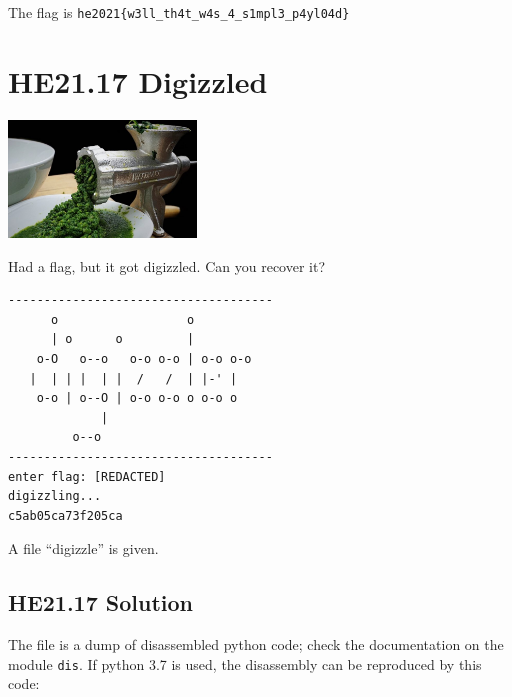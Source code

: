 \documentclass[english,a4paper,nols,noindent]{tufte-handout}
\begin{document}
The flag is \verb+he2021{w3ll_th4t_w4s_4_s1mpl3_p4yl04d}+


\hypertarget{he21.17}{%
  \section{HE21.17 Digizzled}
  \label{he21.17}}
\begin{marginfigure}
    \includegraphics[width=50mm]{images/challenge17.jpg}
\end{marginfigure}

\noindent Had a flag, but it got digizzled. Can you recover it?

\begin{verbatim}
-------------------------------------  
      o                  o             
      | o      o         |             
    o-O   o--o   o-o o-o | o-o o-o     
   |  | | |  | |  /   /  | |-' |       
    o-o | o--O | o-o o-o o o-o o       
             |                         
         o--o                          
-------------------------------------
enter flag: [REDACTED]    
digizzling...  
c5ab05ca73f205ca  
\end{verbatim}

A file ``digizzle'' is given.

\hypertarget{he21.17-solution}{%
\subsection{HE21.17 Solution}\label{he21.17-solution}}

\noindent The file is a dump of disassembled python code; check the
documentation on the module \verb+dis+.  If python 3.7 is used, the
disassembly can be reproduced by this code:
\end{document}
